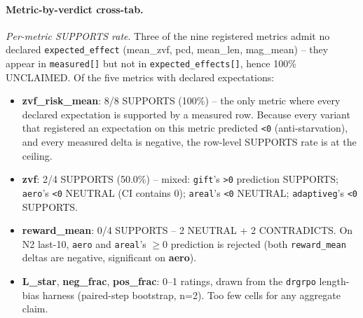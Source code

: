\paragraph{Metric-by-verdict cross-tab.}
\textit{Per-metric SUPPORTS rate}.  Three of the nine registered metrics
admit no declared \texttt{expected\_effect} (mean\_zvf, pcd, mean\_len,
mag\_mean) -- they appear in \texttt{measured[]} but not in
\texttt{expected\_effects[]}, hence 100\% UNCLAIMED.  Of the five metrics
with declared expectations:
\begin{itemize}
\item \textbf{zvf\_risk\_mean}: 8/8 SUPPORTS (100\%) -- the only
metric where every declared expectation is supported by a measured row.
Because every variant that registered an expectation on this metric
predicted \texttt{<0} (anti-starvation), and every measured delta is
negative, the row-level SUPPORTS rate is at the ceiling.
\item \textbf{zvf}: 2/4 SUPPORTS (50.0\%) -- mixed: \texttt{gift}'s
\texttt{>0} prediction SUPPORTS; \texttt{aero}'s \texttt{<0} NEUTRAL (CI
contains 0); \texttt{areal}'s \texttt{<0} NEUTRAL; \texttt{adaptiveg}'s
\texttt{<0} SUPPORTS.
\item \textbf{reward\_mean}: 0/4 SUPPORTS -- 2 NEUTRAL + 2 CONTRADICTS.
On N2 last-10, \texttt{aero} and \texttt{areal}'s $\geq 0$ prediction is
rejected (both \texttt{reward\_mean} deltas are negative, significant on
\textbf{aero}).
\item \textbf{L\_star}, \textbf{neg\_frac}, \textbf{pos\_frac}: 0--1
ratings, drawn from the \texttt{drgrpo} length-bias harness (paired-step
bootstrap, n=2).  Too few cells for any aggregate claim.
\end{itemize}

